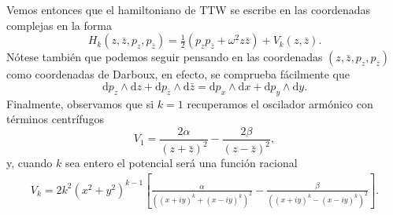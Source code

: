\documentclass[12pt,a4paper,twoside]{article}
\theoremstyle{definition} \newtheorem{defn}[thm]{Definición}
\theoremstyle{definition} \newtheorem{ejemplo}[thm]{Ejemplo}
\theoremstyle{definition} \newtheorem{ejercicio}[thm]{Ejercicio}
\theoremstyle{remark} \newtheorem*{obs}{Observación}
\def\dd{\mathrm{d}}
\def\zz{\bar{z}}
\begin{document}
Vemos entonces que el hamiltoniano de TTW se escribe en las coordenadas complejas en la forma
\begin{equation}
  H_k(z,\zz,p_z,p_{\zz})=\tfrac{1}{2}(p_zp_{\zz}+\omega^2 z \zz) + V_k(z,\zz).
\end{equation}
Nótese también que podemos seguir pensando en las coordenadas $(z,\zz,p_z,p_{\zz})$ como coordenadas de Darboux, en efecto, se comprueba fácilmente que
\begin{equation}
  \dd p_z \wedge \dd z + \dd p_{\zz} \wedge \dd \zz=\dd p_x \wedge \dd x + \dd p_y \wedge \dd y.
\end{equation}
Finalmente, observamos que si $k=1$ recuperamos el oscilador armónico con términos centrífugos
\begin{equation}
  V_1=\frac{2\alpha}{(z+\zz)^2}-\frac{2\beta}{(z-\zz)^2},
\end{equation}
y, cuando $k$ sea entero el potencial será una función racional
\begin{align}
  V_k=2k^2(x^2+y^2)^{k-1}\left[ \frac{\alpha}{\left( (x+iy)^k+(x-iy)^k \right)^2}-\frac{\beta}{\left( (x+iy)^k-(x-iy)^k \right)^2} \right].
\end{align}
\end{document}
